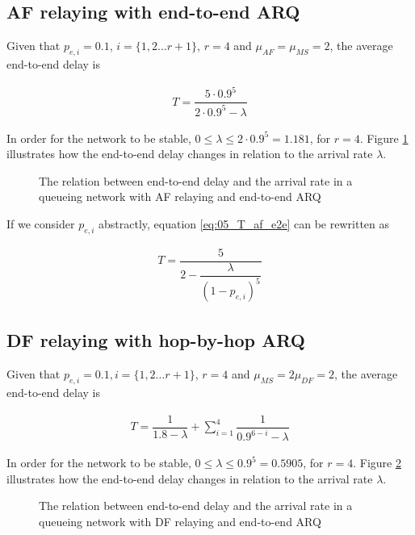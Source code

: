 \subsection{AF relaying with end-to-end ARQ}
Given that $p_{e,i} = 0.1$, $i = \{1,2 \dots r+1\}$, $r=4$ and
$\mu_{AF} = \mu_{MS} = 2$, the average end-to-end delay is

\begin{align}
  T = \dfrac{5 \cdot 0.9^5}{2 \cdot 0.9^5 - \lambda}
  \label{eq:05_T_af_e2e}
\end{align}

In order for the network to be stable,
$0 \leq \lambda \leq 2 \cdot 0.9^5 = 1.181$, for $r=4$. Figure
\ref{fig:05_arrival_rate_af_e2e} illustrates how the end-to-end delay changes
in relation to the arrival rate $\lambda$.

\begin{figure}\centering
  
  \caption{The relation between end-to-end delay and the arrival rate in a
    queueing network with AF relaying and end-to-end ARQ}
  \label{fig:05_arrival_rate_af_e2e}
\end{figure}

If we consider $p_{e,i}$ abstractly, equation \ref{eq:05_T_af_e2e} can be
rewritten as

\begin{align*}
  T = \dfrac{5}{2 - \dfrac{\lambda}{(1-p_{e,i})^5}}
\end{align*}


\subsection{DF relaying with hop-by-hop ARQ}
Given that $p_{e,i} = 0.1, i = \{1,2 \dots r+1\}$, $r=4$ and
$\mu_{MS} = 2\mu_{DF} = 2$, the average end-to-end delay is

\begin{align}
  T = \dfrac{1}{1.8 - \lambda} + \sum\limits_{i=1}^4 \dfrac{1}{0.9^{6-i} - \lambda}
  \label{eq:05_T_df_e2e}
\end{align}


In order for the network to be stable,
$0 \leq \lambda \leq 0.9^5 = 0.5905$, for $r=4$. Figure
\ref{fig:05_arrival_rate_df_e2e} illustrates how the end-to-end delay changes in
relation to the arrival rate $\lambda$.


\begin{figure}\centering
  
  \caption{The relation between end-to-end delay and the arrival rate in a
    queueing network with DF relaying and end-to-end ARQ}
  \label{fig:05_arrival_rate_df_e2e}
\end{figure}
